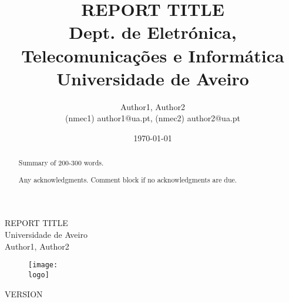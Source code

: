 \documentclass{report}
\begin{document}
%
\def\titledoc{REPORT TITLE}
\def\datedoc{DATE}
\def\authors{Author1, Author2}
\def\authorscontacts{(nmec1) author1@ua.pt, (nmec2) author2@ua.pt}
\def\version{VERSION}
\def\department{Dept. de Eletrónica, Telecomunicações e Informática}
\def\company{Universidade de Aveiro}
\def\logo{ua.pdf}
%
%
\begin{titlepage}

\begin{center}
%
\vspace*{50mm}
%
{\Huge \titledoc}\\ 
%
\vspace{10mm}
%
{\Large \company}\\
%
\vspace{10mm}
%
{\LARGE \authors}\\ 
%
\vspace{30mm}
%
\begin{figure}[h]
\center
\texttt{[image: \\logo]}
\end{figure}
%
\vspace{30mm}
\end{center}
%
\begin{flushright}
\version
\end{flushright}
\end{titlepage}

\title{%
{\Huge\textbf{\titledoc}}\\
{\Large \department\\ \company}
}
%
\author{%
    \authors \\
    \authorscontacts
}
%
\date{\today}
%
\maketitle


\begin{abstract}
Summary of 200-300 words.
\end{abstract}

\renewcommand{\abstractname}{Acknowledgments}
\begin{abstract}
Any acknowledgments.
Comment block if no acknowledgments are due.
\end{abstract}


\tableofcontents
\end{document}
